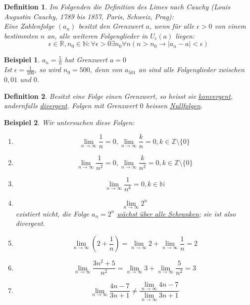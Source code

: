 \documentclass{report}
\newtheorem{mydef}{Definition}
\newtheorem{myexample}{Beispiel}
\begin{document}
\begin{mydef}Im Folgenden die Definition des Limes nach Cauchy (Louis Augustin Cauchy, 1789 bis 1857, Paris, Schweiz, Prag):\\
Eine Zahlenfolge $(a_n)$ besitzt den Grenzwert $a$, wenn für alle $\epsilon > 0$ von einem bestimmten $n$ an, alle weiteren Folgenglieder in $U_\epsilon(a)$ liegen:
\begin{equation}\epsilon \in \mathbb{R}, n_0 \in \mathbb{N}: \forall \epsilon > 0\exists n_0 \forall n (n > n_0 \to |a_n-a| < \epsilon)\end{equation}\end{mydef}
\begin{myexample}$a_n = \frac{5}{n}$ hat Grenzwert $a=0$\\
Ist $\epsilon = \frac{1}{100}$, so wird $n_0 = 500$, denn von $a_{501}$ an sind alle Folgenglieder zwischen $0,01$ und $0$.\end{myexample}
\begin{mydef}Besitzt eine Folge einen Grenzwert, so heisst sie \underline{konvergent}, andernfalls \underline{divergent}. Folgen mit Grenzwert $0$ heissen \underline{Nullfolgen}.\end{mydef}
\begin{myexample}Wir untersuchen diese Folgen:\begin{enumerate}
\item \begin{equation}\lim_{n \to \infty}\frac{1}{n}=0, \lim_{n \to \infty}\frac{k}{n} = 0, k \in \mathbb{Z} \setminus \{0\}\end{equation}
\item \begin{equation}\lim_{n \to \infty}\frac{1}{n^2}=0, \lim_{n \to \infty}\frac{k}{n^2} = 0, k \in \mathbb{Z} \setminus \{0\}\end{equation}
\item \begin{equation}\lim_{n \to \infty}\frac{1}{n^k}=0, k \in \mathbb{N}\end{equation}
\item \begin{equation}\lim_{n \to \infty}2^n\end{equation} existiert nicht, die Folge $a_n = 2^n$ \underline{wächst über alle Schranken}; sie ist also divergent.
\item \begin{equation}\lim_{n \to \infty}(2+\frac{1}{n}) = \lim_{n \to \infty}2 + \lim_{n \to \infty}\frac{1}{n} = 2\end{equation}
\item \begin{equation}\lim_{n \to \infty}\frac{3n^2+5}{n^2} = \lim_{n \to \infty}3 + \lim_{n \to \infty}\frac{5}{n^2} = 3\end{equation}
\item \begin{equation}\lim_{n \to \infty}\frac{4n-7}{3n+1} \neq \frac{\lim_{n \to \infty}4n-7}{\lim_{n \to \infty}3n+1}\end{equation}
\end{enumerate}\end{myexample}
\end{document}
